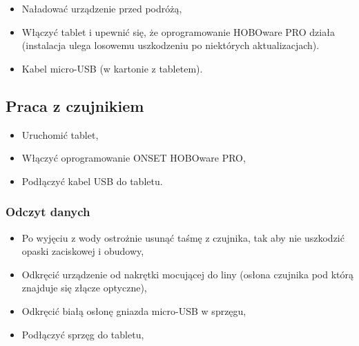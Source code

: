 \documentclass[
  letterpaper,
  DIV=11,
  numbers=noendperiod]{scrreprt}
\providecommand{\tightlist}{%
  \setlength{\itemsep}{0pt}\setlength{\parskip}{0pt}}\usepackage{longtable,booktabs,array}
\begin{document}
\begin{tcolorbox}[enhanced jigsaw, toptitle=1mm, bottomtitle=1mm, opacitybacktitle=0.6, colframe=quarto-callout-important-color-frame, bottomrule=.15mm, title=\textcolor{quarto-callout-important-color}{\faExclamation}\hspace{0.5em}{Tablet}, colbacktitle=quarto-callout-important-color!10!white, left=2mm, breakable, rightrule=.15mm, colback=white, opacityback=0, arc=.35mm, coltitle=black, leftrule=.75mm, toprule=.15mm, titlerule=0mm]

\begin{itemize}
\tightlist
\item
  Naładować urządzenie przed podróżą,
\item
  Włączyć tablet i upewnić się, że oprogramowanie HOBOware PRO działa
  (instalacja ulega losowemu uszkodzeniu po niektórych aktualizacjach).
\end{itemize}

\end{tcolorbox}

\begin{itemize}
\tightlist
\item
  Kabel micro-USB (w kartonie z tabletem).
\end{itemize}

\hypertarget{praca-z-czujnikiem}{%
\subsection{Praca z czujnikiem}\label{praca-z-czujnikiem}}

\begin{itemize}
\tightlist
\item
  Uruchomić tablet,
\item
  Włączyć oprogramowanie ONSET HOBOware PRO,
\item
  Podłączyć kabel USB do tabletu.
\end{itemize}

\hypertarget{odczyt-danych}{%
\subsubsection{Odczyt danych}\label{odczyt-danych}}

\begin{itemize}
\tightlist
\item
  Po wyjęciu z wody ostrożnie usunąć taśmę z czujnika, tak aby nie
  uszkodzić opaski zaciskowej i obudowy,
\item
  Odkręcić urządzenie od nakrętki mocującej do liny (osłona czujnika pod
  którą znajduje się złącze optyczne),
\item
  Odkręcić białą osłonę gniazda micro-USB w sprzęgu,
\item
  Podłączyć sprzęg do tabletu,
\end{itemize}
\end{document}
